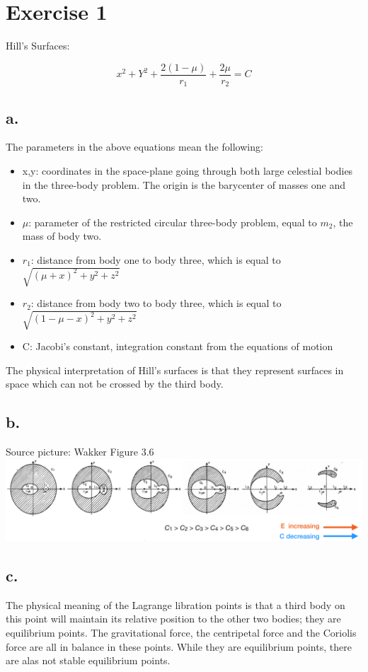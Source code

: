\section{Exercise 1}

Hill's Surfaces:

\begin{equation}
    x^2 + Y^2 + \frac{2(1-\mu)}{r_1} + \frac{2 \mu}{r_2} = C
\end{equation}

\subsection*{a.}
The parameters in the above equations mean the following:
\begin{itemize}
    \item x,y: coordinates in the space-plane going through both large celestial bodies in the three-body problem. The origin is the barycenter of masses one and two.
    \item $\mu$: parameter of the restricted circular three-body problem, equal to $m_2$, the mass of body two.
    \item $r_1$: distance from body one to body three, which is equal to $\sqrt{(\mu+x)^2+y^2+z^2}$
    \item $r_2$: distance from body two to body three, which is equal to $\sqrt{(1-\mu-x)^2+y^2+z^2}$
    \item C: Jacobi's constant, integration constant from the equations of motion
\end{itemize}

The physical interpretation of Hill's surfaces is that they represent surfaces in space which can not be crossed by the third body.

\subsection*{b.}
Source picture: Wakker Figure 3.6 \\
\includegraphics[scale = 0.5]{Chapters/Hill_Surfaces.png}

\subsection*{c.}
The physical meaning of the Lagrange libration points is that a third body on this point will maintain its relative position to the other two bodies; they are equilibrium points. The gravitational force, the centripetal force and the Coriolis force are all in balance in these points. While they are equilibrium points, there are alas not stable equilibrium points.

